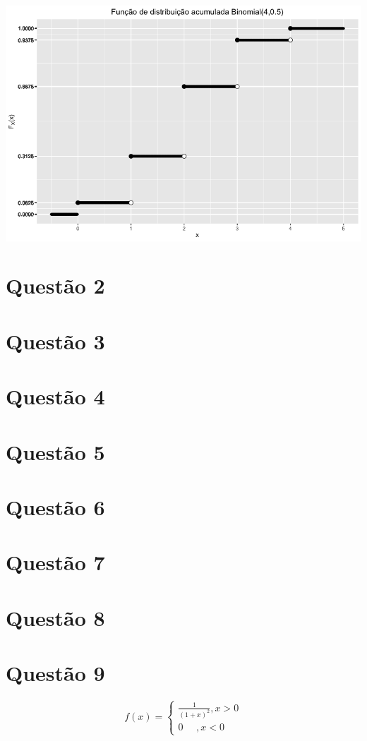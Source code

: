 \documentclass[a4paper,12pt]{report}
\begin{document}
\includegraphics[width=\textwidth]{C2Q1.png}
\section{Questão 2}

\section{Questão 3}
\section{Questão 4}
\section{Questão 5}
\section{Questão 6}
\section{Questão 7}
\section{Questão 8}
\section{Questão 9}
$$ 
f(x)=\begin{cases}
\frac{1}{(1+x)^2}, x>0\\
0 \ \ \  \ \ \ ,x<0
\end{cases}
$$
\end{document}
